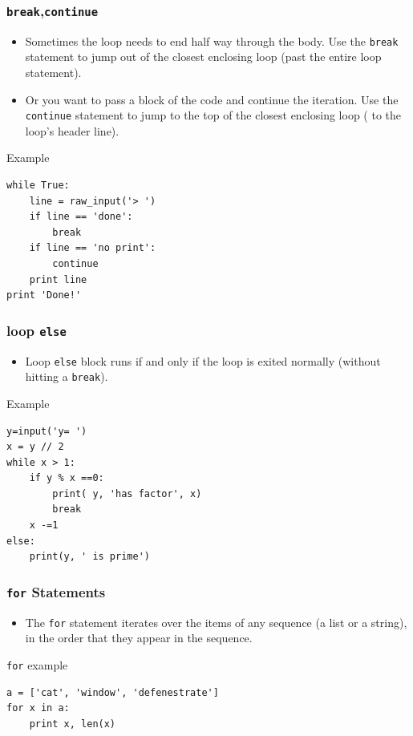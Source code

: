 \documentclass{beamer}
\begin{document}
\begin{frame}[fragile]
\frametitle{\texttt{break},\texttt{continue}}
\begin{itemize}
\item  Sometimes the loop needs to end half
way through the body.  Use the {\tt break}
statement to jump out of the \alert{closest enclosing} loop (past the entire loop statement).
\item Or you want to pass a block of the code and continue the iteration. Use the {\tt continue} statement to jump to the top of the \alert{closest enclosing} loop ( to the loop's header line).
\end{itemize}
\begin{block}{Example}
\tiny
\begin{verbatim}
while True:
    line = raw_input('> ')
    if line == 'done':
        break
    if line == 'no print': 
        continue
    print line
print 'Done!'
\end{verbatim}
\end{block}
\end{frame}
\begin{frame}[fragile]
\frametitle{loop \texttt{else}}
\begin{itemize}
\item Loop {\tt else} block runs  \alert{if and only if} the loop is exited normally (without hitting a \texttt{break}).
\end{itemize}
\begin{block}{Example}
\tiny
\begin{verbatim}
y=input('y= ')
x = y // 2
while x > 1:
    if y % x ==0:
        print( y, 'has factor', x)
        break
    x -=1
else:
    print(y, ' is prime')
\end{verbatim}
\end{block}
\end{frame}
\begin{frame}[fragile]
\frametitle{\texttt{for} Statements}
\begin{itemize}
\item The \texttt{for} statement iterates over the items of any sequence (a list or a string), in the order that they appear in the sequence.
\end{itemize}
\begin{block}{\texttt{for} example}
\begin{verbatim}
a = ['cat', 'window', 'defenestrate']
for x in a:
    print x, len(x)
\end{verbatim}
\end{block}
\end{frame}
\end{document}
